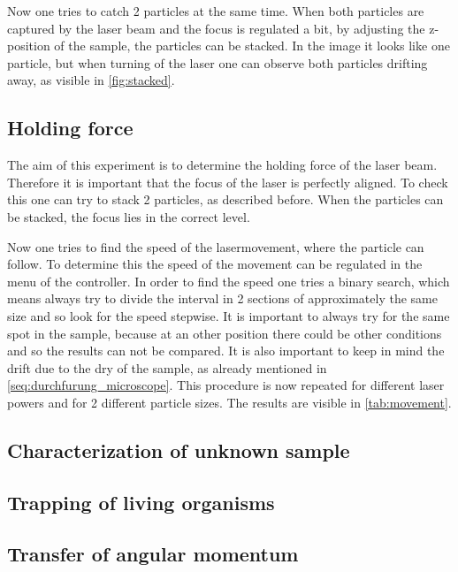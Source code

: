 \documentclass[12pt,english,ngerman]{scrartcl}
\begin{document}

Now one tries to catch 2 particles at the same time. When both particles are captured by the laser beam and the focus is regulated a bit, 
by adjusting the z-position of the sample, the particles can be stacked. In the image it looks like one particle, but when turning of the laser
one can observe both particles drifting away, as visible in \autoref{fig:stacked}.


\subsection{Holding force}

The aim of this experiment is to determine the holding force of the laser beam.
Therefore it is important that the focus of the laser is perfectly aligned. To check this one can try to stack 2 particles, 
as described before. When the particles can be stacked, the focus lies in the correct level.

Now one tries to find the speed of the lasermovement, where the particle can follow. To determine this the speed of the 
movement can be regulated in the menu of the controller. 
In order to find the speed one tries a binary search, which means always try to divide the interval in 2 sections of 
approximately the same size and so look for the speed stepwise.
It is important to always try for the same spot in the sample, because at an other position there could be other conditions 
and so the results can not be compared. It is also important to keep in mind the drift due to the dry of the sample, 
as already mentioned in \autoref{seq:durchfurung_microscope}.
This procedure is now repeated for different laser powers and for 2 different particle sizes.
The results are visible in \autoref{tab:movement}.



\subsection{Characterization of unknown sample}


\subsection{Trapping of living organisms}


\subsection{Transfer of angular momentum}
\end{document}
